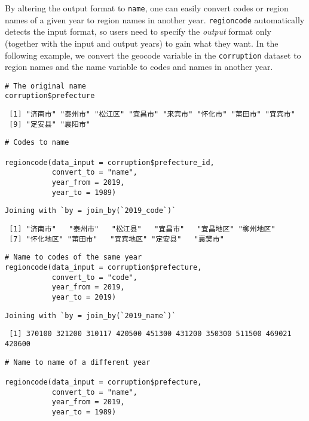 \documentclass[
  article]{jss}
\begin{document}
By altering the output format to \texttt{name}, one can easily convert
codes or region names of a given year to region names in another year.
\texttt{regioncode} automatically detects the input format, so users
need to specify the \emph{output} format only (together with the input
and output years) to gain what they want. In the following example, we
convert the geocode variable in the \texttt{corruption} dataset to
region names and the name variable to codes and names in another year.

\begin{verbatim}
# The original name
corruption$prefecture
\end{verbatim}

\begin{verbatim}
 [1] "济南市" "泰州市" "松江区" "宜昌市" "来宾市" "怀化市" "莆田市" "宜宾市"
 [9] "定安县" "襄阳市"
\end{verbatim}

\begin{verbatim}
# Codes to name

regioncode(data_input = corruption$prefecture_id, 
           convert_to = "name",
           year_from = 2019,
           year_to = 1989)
\end{verbatim}

\begin{verbatim}
Joining with `by = join_by(`2019_code`)`
\end{verbatim}

\begin{verbatim}
 [1] "济南市"   "泰州市"   "松江县"   "宜昌市"   "宜昌地区" "柳州地区"
 [7] "怀化地区" "莆田市"   "宜宾地区" "定安县"   "襄樊市"  
\end{verbatim}

\begin{verbatim}
# Name to codes of the same year
regioncode(data_input = corruption$prefecture, 
           convert_to = "code",
           year_from = 2019,
           year_to = 2019)
\end{verbatim}

\begin{verbatim}
Joining with `by = join_by(`2019_name`)`
\end{verbatim}

\begin{verbatim}
 [1] 370100 321200 310117 420500 451300 431200 350300 511500 469021 420600
\end{verbatim}

\begin{verbatim}
# Name to name of a different year

regioncode(data_input = corruption$prefecture, 
           convert_to = "name",
           year_from = 2019,
           year_to = 1989)
\end{verbatim}
\end{document}
